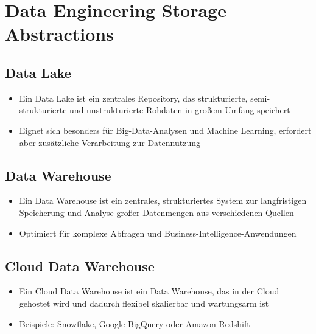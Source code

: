 \documentclass[11pt]{scrartcl}
\begin{document}
\tableofcontents 

\newpage
\section{Data Engineering Storage Abstractions}
\subsection{Data Lake}
\begin{itemize}
	\item Ein Data Lake ist ein zentrales Repository, das strukturierte, semi-strukturierte und unstrukturierte Rohdaten in großem Umfang speichert
	\item Eignet sich besonders für Big-Data-Analysen und Machine Learning, erfordert aber zusätzliche Verarbeitung zur Datennutzung
\end{itemize}


\subsection{Data Warehouse}
\begin{itemize}
	\item Ein Data Warehouse ist ein zentrales, strukturiertes System zur langfristigen Speicherung und Analyse großer Datenmengen aus verschiedenen Quellen
	\item Optimiert für komplexe Abfragen und Business-Intelligence-Anwendungen
\end{itemize}


\subsection{Cloud Data Warehouse}
\begin{itemize}
	\item Ein Cloud Data Warehouse ist ein Data Warehouse, das in der Cloud gehostet wird und dadurch flexibel skalierbar und wartungsarm ist
	\item Beispiele: Snowflake, Google BigQuery oder Amazon Redshift
\end{itemize}
\end{document}
